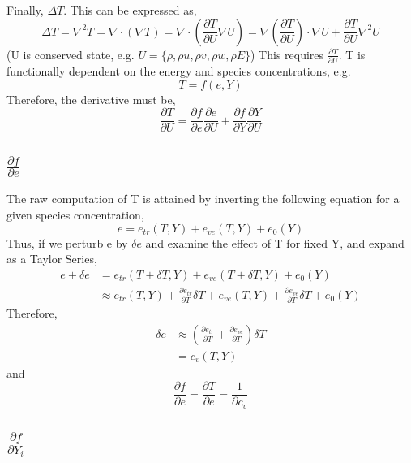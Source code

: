 \documentclass[10pt]{article}
\begin{document}
Finally, $\Delta{}T$. This can be expressed as, 
\begin{equation}
\Delta T = \nabla^2 T = \nabla \cdot (\nabla T) = \nabla \cdot
 (\frac{\partial T}{\partial U} \nabla U) =  \nabla (\frac{\partial
 T}{\partial U} )\cdot \nabla U + \frac{\partial T}{\partial U} \nabla^2 U  
\end{equation}
(U is conserved state, e.g. $U=\{\rho,\rho u,\rho v, \rho w, \rho E
\}$) This requires $\frac{\partial T}{\partial U}$. T is functionally
dependent on the energy and species concentrations, e.g.
\begin{equation}
 T = f(e,Y)
\end{equation}
Therefore, the derivative must be,
\begin{equation}
 \frac{\partial T}{\partial U} = \frac{\partial f}{\partial
  e}\frac{\partial e}{\partial U} + \frac{\partial f}{\partial
  Y}\frac{\partial Y}{\partial U}
\end{equation}

%
% 
%
\subsection{$\frac{\partial f}{\partial e}$}

The raw computation of T is attained by inverting the following equation
for a given species concentration,
\begin{equation}
e = e_{tr}(T,Y) + e_{ve}(T,Y) + e_{0}(Y)
\end{equation}
Thus, if we perturb e by $\delta e$ and examine the effect of T for
fixed Y, and expand as a Taylor Series,
\begin{align}
e + \delta e &= e_{tr}(T + \delta T,Y) + e_{ve}(T+\delta T,Y) + e_{0}(Y) \\
 &\approx e_{tr}(T,Y) + \frac{\partial e_{tr}}{\partial T} \delta T +
 e_{ve}(T,Y)+ \frac{\partial e_{ve}}{\partial T} \delta T + e_{0}(Y)
\end{align}
Therefore, 
\begin{align}
\delta e &\approx \left( \frac{\partial e_{tr}}{\partial T} +
 \frac{\partial e_{ve}}{\partial T} \right) \delta T \\ 
 &= c_v(T,Y)
\end{align}
and
\begin{equation}
 \frac{\partial f}{\partial e} = \frac{\partial T}{\partial e} = \frac{1}{\partial c_v}
\end{equation}

%
% 
%
\subsection{$\frac{\partial f}{\partial Y_i}$}
\end{document}
